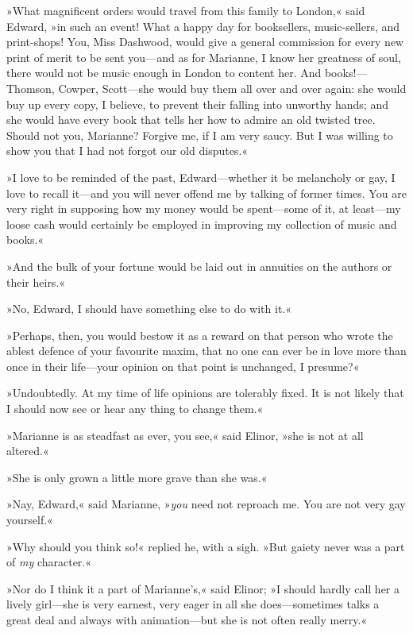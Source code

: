 »What magnificent orders would travel from this family to London,« said Edward, »in such an event! What a happy day for booksellers, music-sellers, and print-shops! You, Miss Dashwood, would give a general commission for every new print of merit to be sent you—and as for Marianne, I know her greatness of soul, there would not be music enough in London to content her. And books!—Thomson, Cowper, Scott—she would buy them all over and over again: she would buy up every copy, I believe, to prevent their falling into unworthy hands; and she would have every book that tells her how to admire an old twisted tree. Should not you, Marianne? Forgive me, if I am very saucy. But I was willing to show you that I had not forgot our old disputes.«

»I love to be reminded of the past, Edward—whether it be melancholy or gay, I love to recall it—and you will never offend me by talking of former times. You are very right in supposing how my money would be spent—some of it, at least—my loose cash would certainly be employed in improving my collection of music and books.«

»And the bulk of your fortune would be laid out in annuities on the authors or their heirs.«

»No, Edward, I should have something else to do with it.«

»Perhaps, then, you would bestow it as a reward on that person who wrote the ablest defence of your favourite maxim, that no one can ever be in love more than once in their life—your opinion on that point is unchanged, I presume?«

»Undoubtedly. At my time of life opinions are tolerably fixed. It is not likely that I should now see or hear any thing to change them.«

»Marianne is as steadfast as ever, you see,« said Elinor, »she is not at all altered.«

»She is only grown a little more grave than she was.«

»Nay, Edward,« said Marianne, »\textit{you} need not reproach me. You are not very gay yourself.«

»Why should you think so!« replied he, with a sigh. »But gaiety never was a part of \textit{my} character.«

»Nor do I think it a part of Marianne’s,« said Elinor; »I should hardly call her a lively girl—she is very earnest, very eager in all she does—sometimes talks a great deal and always with animation—but she is not often really merry.«

